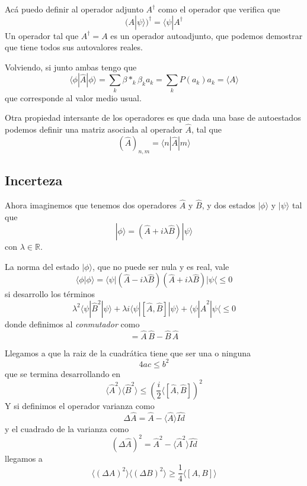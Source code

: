 \documentclass{book}
\numberwithin{equation}{section} %
\begin{document}
Acá puedo definir al operador adjunto $A^\dagger$ como el operador que verifica que
\begin{equation}
    (A |\psi \rangle)^\dagger = \langle \psi | A^\dagger
\end{equation}
Un operador tal que $A^\dagger = A$ es un operador autoadjunto, que podemos demostrar que tiene todos sus autovalores reales.

Volviendo, si junto ambas tengo que
\begin{equation}
    \langle \phi | \hat{A} | \phi \rangle = \sum_k \beta*_k \beta_k a_k = \sum_k P(a_k) a_k = \langle A \rangle
\end{equation}
que corresponde al valor medio usual.

Otra propiedad intersante de los operadores es que dada una base de autoestados podemos definir una matriz asociada al operador $\hat{A}$, tal que
\begin{equation}
    (\hat{A})_{n,m} = \langle n | \hat{A} | m \rangle
\end{equation}

\subsection{Incerteza}
Ahora imaginemos que tenemos dos operadores $\hat{A}$ y $\hat{B}$, y dos estados $|\phi\rangle$ y $|\psi\rangle$ tal que
\[ |\phi\rangle = (\hat{A} + i \lambda \hat{B}) |\psi\rangle\]
con $\lambda \in \mathbb{R}$.

La norma del estado $|\phi\rangle$, que no puede ser nula y es real, vale
\[ \langle \phi | \phi \rangle = \langle \psi | (\hat{A} - i \lambda \hat{B}) (\hat{A} + i \lambda \hat{B})|\psi\langle \leq 0\]
si desarrollo los términos
\[ \lambda^2 \langle \psi | \hat{B}^2 |\psi \rangle + \lambda i \langle \psi | [\hat{A},\hat{B}] |\psi \rangle + \langle \psi | \hat{A}^2 | \psi \langle \leq 0 \]
donde definimos al \emph{conmutador} como
\begin{equation}
    [\hat{A},\hat{B}] = \hat{A}\,\hat{B} - \hat{B}\,\hat{A}
  \label{eq:conmutador}
\end{equation}

Llegamos a que la raiz de la cuadrática tiene que ser una o ninguna
\[ 4 a c \leq b^2 \]
que se termina desarrollando en
\begin{equation}
    \langle \hat{A}^2 \rangle \langle \hat{B}^2 \rangle \leq \left(\frac{i}{2} \langle [\hat{A},\hat{B}] \right)^2
\end{equation}
Y si definimos el operador varianza como
\begin{equation}
    \Delta \hat{A} = \hat{A} - \langle \hat{A} \rangle \hat{Id}
\end{equation}
y el cuadrado de la varianza como
\begin{equation}
    (\Delta \hat{A})^2 = \hat{A}^2 - \langle \hat{A}^2 \rangle \hat{Id}
\end{equation}
llegamos a 
\begin{equation}
  \langle(\Delta A)^2\rangle \langle(\Delta B)^2\rangle \geq \frac{1}{4} \langle [A, B] \rangle
\end{equation}
\end{document}
